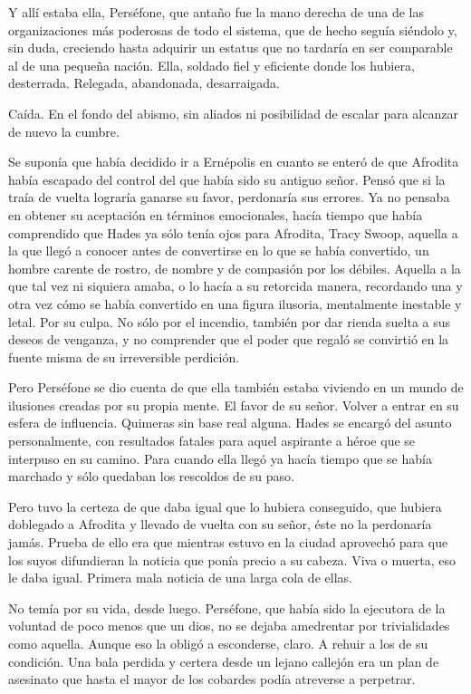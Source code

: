 Y allí estaba ella, Perséfone, que antaño fue la mano derecha de una de las organizaciones más poderosas de todo el sistema, que de hecho seguía siéndolo y, sin duda, creciendo hasta adquirir un estatus que no tardaría en ser comparable al de una pequeña nación. Ella, soldado fiel y eficiente donde los hubiera, desterrada. Relegada, abandonada, desarraigada.

Caída. En el fondo del abismo, sin aliados ni posibilidad de escalar para alcanzar de nuevo la cumbre.

Se suponía que había decidido ir a Ernépolis en cuanto se enteró de que Afrodita había escapado del control del que había sido su antiguo señor. Pensó que si la traía de vuelta lograría ganarse su favor, perdonaría sus errores. Ya no pensaba en obtener su aceptación en términos emocionales, hacía tiempo que había comprendido que Hades ya sólo tenía ojos para Afrodita, Tracy Swoop, aquella a la que llegó a conocer antes de convertirse en lo que se había convertido, un hombre carente de rostro, de nombre y de compasión por los débiles. Aquella a la que tal vez ni siquiera amaba, o lo hacía a su retorcida manera, recordando una y otra vez cómo se había convertido en una figura ilusoria, mentalmente inestable y letal. Por su culpa. No sólo por el incendio, también por dar rienda suelta a sus deseos de venganza, y no comprender que el poder que  regaló se convirtió en la fuente misma de su irreversible perdición.

Pero Perséfone se dio cuenta de que ella también estaba viviendo en un mundo de ilusiones creadas por su propia mente. El favor de su señor. Volver a entrar en su esfera de influencia. Quimeras sin base real alguna. Hades se encargó del asunto personalmente, con resultados fatales para aquel aspirante a héroe que se interpuso en su camino. Para cuando ella llegó ya hacía tiempo que se había marchado y sólo quedaban los rescoldos de su paso.

Pero tuvo la certeza de que daba igual que lo hubiera conseguido, que hubiera doblegado a Afrodita y llevado de vuelta con su señor, éste no la perdonaría jamás. Prueba de ello era que mientras estuvo en la ciudad aprovechó para que los suyos difundieran la noticia que ponía precio a su cabeza. Viva o muerta, eso le daba igual. Primera mala noticia de una larga cola de ellas.

No temía por su vida, desde luego. Perséfone, que había sido la ejecutora de la voluntad de poco menos que un dios, no se dejaba amedrentar por trivialidades como aquella. Aunque eso la obligó a esconderse, claro. A rehuir a los de su condición. Una bala perdida y certera desde un lejano callejón era un plan de asesinato que hasta el mayor de los cobardes podía atreverse a perpetrar.

